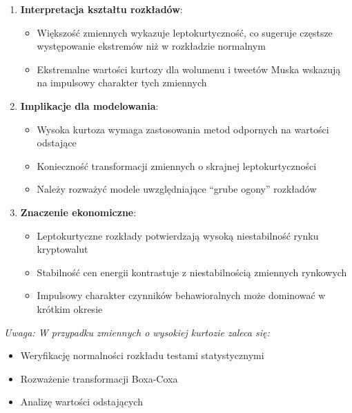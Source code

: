 \documentclass[
  11pt,
]{article}
\providecommand{\tightlist}{%
  \setlength{\itemsep}{0pt}\setlength{\parskip}{0pt}}
\begin{document}
\begin{enumerate}
\def\labelenumi{\arabic{enumi}.}
\tightlist
\item
  \textbf{Interpretacja kształtu rozkładów}: \vspace{0.2cm}

  \begin{itemize}
  \tightlist
  \item
    Większość zmiennych wykazuje leptokurtyczność, co sugeruje częstsze
    występowanie ekstremów niż w rozkładzie normalnym
  \item
    Ekstremalne wartości kurtozy dla wolumenu i tweetów Muska wskazują
    na impulsowy charakter tych zmiennych
  \end{itemize}
\item
  \textbf{Implikacje dla modelowania}: \vspace{0.2cm}

  \begin{itemize}
  \tightlist
  \item
    Wysoka kurtoza wymaga zastosowania metod odpornych na wartości
    odstające
  \item
    Konieczność transformacji zmiennych o skrajnej leptokurtyczności
  \item
    Należy rozważyć modele uwzględniające ``grube ogony'' rozkładów
  \end{itemize}
\item
  \textbf{Znaczenie ekonomiczne}: \vspace{0.2cm}

  \begin{itemize}
  \tightlist
  \item
    Leptokurtyczne rozkłady potwierdzają wysoką niestabilność rynku
    kryptowalut
  \item
    Stabilność cen energii kontrastuje z niestabilnością zmiennych
    rynkowych
  \item
    Impulsowy charakter czynników behawioralnych może dominować w
    krótkim okresie
  \end{itemize}
\end{enumerate}

\vspace{0.3cm}

\textit{Uwaga: W przypadku zmiennych o wysokiej kurtozie zaleca się:}

\begin{itemize}
\item Weryfikację normalności rozkładu testami statystycznymi
\item Rozważenie transformacji Boxa-Coxa
\item Analizę wartości odstających
\end{itemize}
\end{document}
